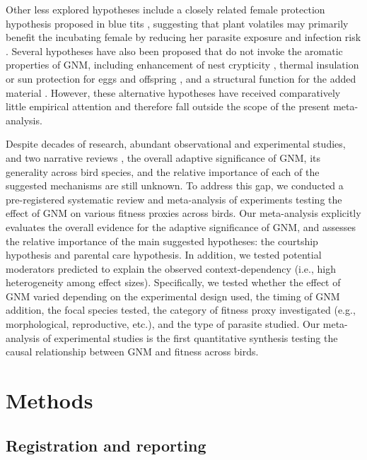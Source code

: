 \documentclass[
  number,
  review,
  onecolumn]{elsarticle}
\begin{document}
Other less explored hypotheses include a closely related female
protection hypothesis proposed in blue tits
\citep{cowie1988, banbura1995}, suggesting that plant volatiles may
primarily benefit the incubating female by reducing her parasite
exposure and infection risk \citep{garcía-campa2024}. Several hypotheses
have also been proposed that do not invoke the aromatic properties of
GNM, including enhancement of nest crypticity \citep{skutch1957},
thermal insulation or sun protection for eggs and offspring
\citep{mertens1977}, and a structural function for the added material
\citep{lyons1987}. However, these alternative hypotheses have received
comparatively little empirical attention and therefore fall outside the
scope of the present meta-analysis.

Despite decades of research, abundant observational and experimental
studies, and two narrative reviews
\citep{dubiec2013, scott-baumann2015}, the overall adaptive significance
of GNM, its generality across bird species, and the relative importance
of each of the suggested mechanisms are still unknown. To address this
gap, we conducted a pre-registered systematic review and meta-analysis
of experiments testing the effect of GNM on various fitness proxies
across birds. Our meta-analysis explicitly evaluates the overall
evidence for the adaptive significance of GNM, and assesses the relative
importance of the main suggested hypotheses: the courtship hypothesis
and parental care hypothesis. In addition, we tested potential
moderators predicted to explain the observed context-dependency (i.e.,
high heterogeneity among effect sizes). Specifically, we tested whether
the effect of GNM varied depending on the experimental design used, the
timing of GNM addition, the focal species tested, the category of
fitness proxy investigated (e.g., morphological, reproductive, etc.),
and the type of parasite studied. Our meta-analysis of experimental
studies is the first quantitative synthesis testing the causal
relationship between GNM and fitness across birds.

\section{Methods}\label{methods}

\subsection{Registration and
reporting}\label{registration-and-reporting}
\end{document}
